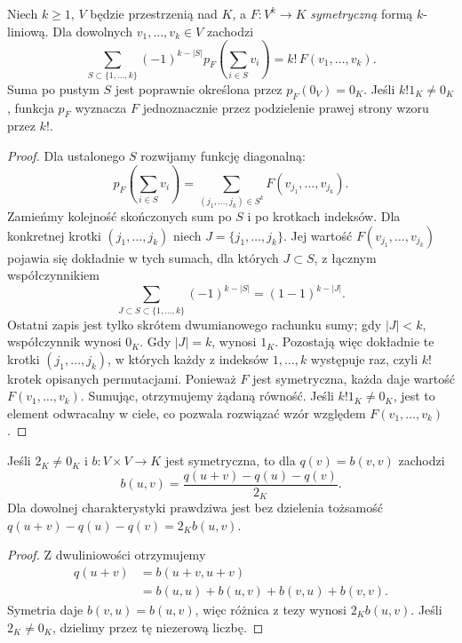 \begin{twierdzenie}
\label{thm:lin8-polaryzacja}
Niech \(k\geq1\),
\(V\) będzie przestrzenią nad \(K\),
a \(F\colon V^k\to K\)
\emph{symetryczną} formą \(k\)-liniową.
Dla dowolnych \(v_1,\ldots,v_k\in V\)
zachodzi
\[
 \sum_{S\subset\{1,\ldots,k\}}
 (-1)^{k-|S|}
 p_F\!\left(\sum_{i\in S}v_i\right)
 =k!\,F(v_1,\ldots,v_k).
\]
Suma po pustym \(S\)
jest poprawnie określona przez
\(p_F(0_V)=0_K\).
Jeśli \(k!1_K\ne0_K\),
funkcja \(p_F\) wyznacza \(F\)
jednoznacznie przez podzielenie
prawej strony wzoru przez \(k!\).
\end{twierdzenie}
\begin{proof}
Dla ustalonego \(S\)
rozwijamy funkcję diagonalną:
\[
 p_F\!\left(\sum_{i\in S}v_i\right)
 =\sum_{(j_1,\ldots,j_k)\in S^k}
   F(v_{j_1},\ldots,v_{j_k}).
\]
Zamieńmy kolejność
skończonych sum po \(S\)
i po krotkach indeksów.
Dla konkretnej krotki
\((j_1,\ldots,j_k)\) niech
\(J=\{j_1,\ldots,j_k\}\).
Jej wartość \(F(v_{j_1},\ldots,v_{j_k})\)
pojawia się dokładnie w tych
sumach, dla których \(J\subset S\),
z łącznym współczynnikiem
\[
 \sum_{J\subset S\subset\{1,\ldots,k\}}
  (-1)^{k-|S|}
 =(1-1)^{k-|J|}.
\]
Ostatni zapis jest tylko
skrótem dwumianowego rachunku
sumy; gdy \(|J|<k\),
współczynnik wynosi \(0_K\).
Gdy \(|J|=k\), wynosi \(1_K\).
Pozostają więc dokładnie
te krotki \((j_1,\ldots,j_k)\),
w których każdy z indeksów
\(1,\ldots,k\) występuje raz,
czyli \(k!\) krotek opisanych
permutacjami. Ponieważ \(F\)
jest symetryczna, każda daje
wartość \(F(v_1,\ldots,v_k)\).
Sumując, otrzymujemy żądaną równość.
Jeśli \(k!1_K\ne0_K\),
jest to element odwracalny w ciele,
co pozwala rozwiązać wzór
względem \(F(v_1,\ldots,v_k)\).
\end{proof}

\begin{wniosek}
\label{cor:lin8-polaryzacja-dwu}
Jeśli \(2_K\ne0_K\)
i \(b\colon V\times V\to K\)
jest symetryczna, to
dla \(q(v)=b(v,v)\) zachodzi
\[
 b(u,v)=\frac{q(u+v)-q(u)-q(v)}{2_K}.
\]
Dla dowolnej charakterystyki
prawdziwa jest bez dzielenia
tożsamość
\(q(u+v)-q(u)-q(v)=2_Kb(u,v)\).
\end{wniosek}
\begin{proof}
Z dwuliniowości otrzymujemy
\[
 \begin{aligned}
 q(u+v)
 &=b(u+v,u+v)\\
 &=b(u,u)+b(u,v)+b(v,u)+b(v,v).
 \end{aligned}
\]
Symetria daje
\(b(v,u)=b(u,v)\),
więc różnica z tezy wynosi
\(2_Kb(u,v)\).
Jeśli \(2_K\ne0_K\), dzielimy
przez tę niezerową liczbę.
\end{proof}


